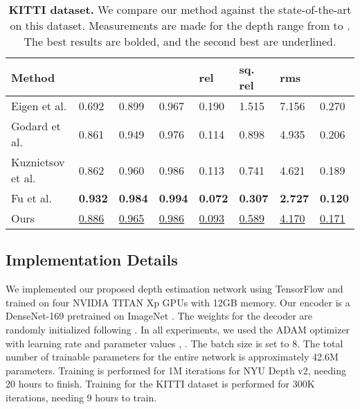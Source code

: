 \documentclass[10pt,twocolumn,letterpaper]{article}
\begin{document}
\begin{table*}[t]
\centering
\begin{tabular}{l|lll|llll}
\toprule
Method         &  &  &  & rel & sq. rel    & rms   &   \\ 
\midrule
Eigen et al. \cite{Eigen2014}       & 0.692  & 0.899  & 0.967 & 0.190 & 1.515 & 7.156 & 0.270 \\
Godard et al. \cite{Godard2017}      & 0.861  & 0.949  & 0.976 & 0.114 & 0.898 & 4.935  & 0.206 \\
Kuznietsov et al. \cite{Kuznietsov2017}  & 0.862  & 0.960  & 0.986 & 0.113 & 0.741 & 4.621 & 0.189 \\
Fu et al. \cite{Fu2018DeepOR}    & \textbf{0.932}  & \textbf{0.984}  & \textbf{0.994} & \textbf{0.072} & \textbf{0.307} & \textbf{2.727}  & \textbf{0.120} \\
Ours                             & \underline{0.886}  & \underline{0.965}  & \underline{0.986} & \underline{0.093} & \underline{0.589} & \underline{4.170} & \underline{0.171} \\
\bottomrule
\end{tabular}
\bigskip
\caption{\textbf{KITTI dataset.} We compare our method against the state-of-the-art on this dataset. Measurements are made for the depth range from  to . The best results are bolded, and the second best are underlined.}
\label{tab:kitti}
\end{table*}



\subsection{Implementation Details} 

We implemented our proposed depth estimation network using TensorFlow \cite{tensorflow2015-whitepaper} and trained on four NVIDIA TITAN Xp GPUs with 12GB memory. Our encoder is a DenseNet-169 \cite{huang2017densely} pretrained on ImageNet \cite{Deng2009}. The weights for the decoder are randomly initialized following \cite{glorot2010understanding}. In all experiments, we used the ADAM \cite{jlb2015adam} optimizer with learning rate  and parameter values , . The batch size is set to 8. The total number of trainable parameters for the entire network is approximately 42.6M parameters. Training is performed for 1M iterations for NYU Depth v2, needing 20 hours to finish. Training for the KITTI dataset is performed for 300K iterations, needing 9 hours to train.
\end{document}
